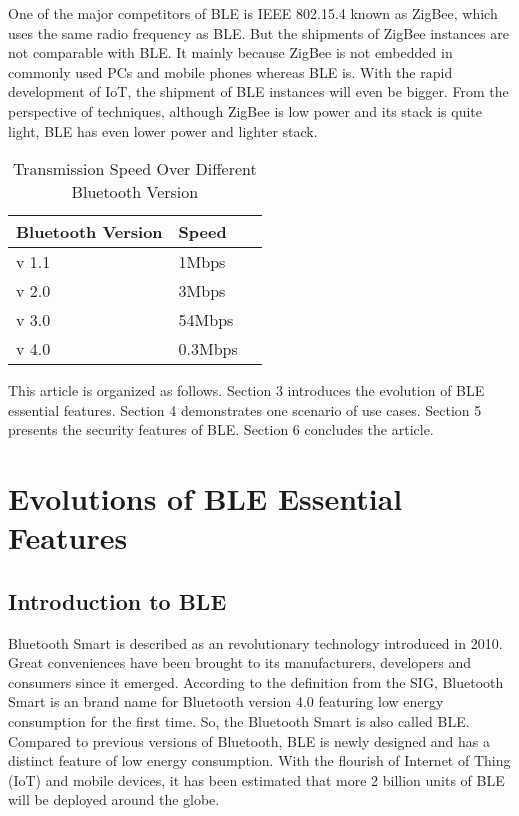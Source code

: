 \documentclass{cseminar}
\begin{document}
One of the major competitors of BLE is IEEE 802.15.4 known as ZigBee, which uses the same radio frequency as BLE. But the shipments of ZigBee instances are not comparable with BLE\cite{BLE05}. It mainly because ZigBee is not embedded in commonly used PCs and mobile phones whereas BLE is. With the rapid development of IoT, the shipment of BLE instances will even be bigger. From the perspective of techniques, although ZigBee is low power and its stack is quite light, BLE has even lower power and lighter stack\cite{BLE02}.

\begin{table}[t]
  \begin{center}
    \begin{tabular}{|l|lr|}
    \hline
    Bluetooth Version & Speed &\\
    \hline
    v 1.1  & 1Mbps &\\
    v 2.0  & 3Mbps &\\
    v 3.0  & 54Mbps &\\
    v 4.0  & 0.3Mbps &\\
    \hline
    \end{tabular}
    \caption{Transmission Speed Over Different Bluetooth Version}
    \label{Bluetooth_Speed}
  \end{center}
\end{table}

This article is organized as follows. Section 3 introduces the evolution of BLE essential features. Section 4 demonstrates one scenario of use cases. Section 5 presents the security features of BLE. Section 6 concludes the article.

\section{Evolutions of BLE Essential Features}
\subsection{Introduction to BLE}
Bluetooth Smart is described as an revolutionary technology introduced in 2010. Great conveniences have been brought to its manufacturers, developers and consumers since it emerged. According to the definition from the SIG, Bluetooth Smart is an brand name for Bluetooth version 4.0 featuring low energy consumption for the first time. So, the Bluetooth Smart is also called BLE. Compared to previous versions of Bluetooth, BLE is newly designed and has a distinct feature of low energy consumption. With the flourish of Internet of Thing (IoT) and mobile devices, it has been estimated that more 2 billion units of BLE will be deployed around the globe\cite{BLE01}. 
\end{document}
